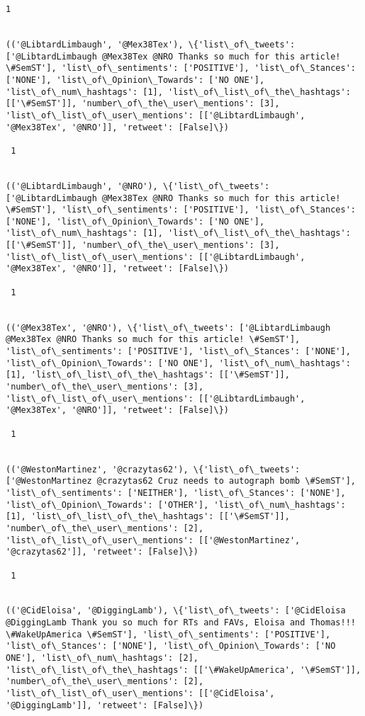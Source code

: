 \documentclass[11pt]{article}
\begin{document}
\begin{Verbatim}[commandchars=\\\{\}]
 1
 

(('@LibtardLimbaugh', '@Mex38Tex'), \{'list\_of\_tweets': ['@LibtardLimbaugh @Mex38Tex @NRO Thanks so much for this article! \#SemST'], 'list\_of\_sentiments': ['POSITIVE'], 'list\_of\_Stances': ['NONE'], 'list\_of\_Opinion\_Towards': ['NO ONE'], 'list\_of\_num\_hashtags': [1], 'list\_of\_list\_of\_the\_hashtags': [['\#SemST']], 'number\_of\_the\_user\_mentions': [3], 'list\_of\_list\_of\_user\_mentions': [['@LibtardLimbaugh', '@Mex38Tex', '@NRO']], 'retweet': [False]\})

 1
 

(('@LibtardLimbaugh', '@NRO'), \{'list\_of\_tweets': ['@LibtardLimbaugh @Mex38Tex @NRO Thanks so much for this article! \#SemST'], 'list\_of\_sentiments': ['POSITIVE'], 'list\_of\_Stances': ['NONE'], 'list\_of\_Opinion\_Towards': ['NO ONE'], 'list\_of\_num\_hashtags': [1], 'list\_of\_list\_of\_the\_hashtags': [['\#SemST']], 'number\_of\_the\_user\_mentions': [3], 'list\_of\_list\_of\_user\_mentions': [['@LibtardLimbaugh', '@Mex38Tex', '@NRO']], 'retweet': [False]\})

 1
 

(('@Mex38Tex', '@NRO'), \{'list\_of\_tweets': ['@LibtardLimbaugh @Mex38Tex @NRO Thanks so much for this article! \#SemST'], 'list\_of\_sentiments': ['POSITIVE'], 'list\_of\_Stances': ['NONE'], 'list\_of\_Opinion\_Towards': ['NO ONE'], 'list\_of\_num\_hashtags': [1], 'list\_of\_list\_of\_the\_hashtags': [['\#SemST']], 'number\_of\_the\_user\_mentions': [3], 'list\_of\_list\_of\_user\_mentions': [['@LibtardLimbaugh', '@Mex38Tex', '@NRO']], 'retweet': [False]\})

 1
 

(('@WestonMartinez', '@crazytas62'), \{'list\_of\_tweets': ['@WestonMartinez @crazytas62 Cruz needs to autograph bomb \#SemST'], 'list\_of\_sentiments': ['NEITHER'], 'list\_of\_Stances': ['NONE'], 'list\_of\_Opinion\_Towards': ['OTHER'], 'list\_of\_num\_hashtags': [1], 'list\_of\_list\_of\_the\_hashtags': [['\#SemST']], 'number\_of\_the\_user\_mentions': [2], 'list\_of\_list\_of\_user\_mentions': [['@WestonMartinez', '@crazytas62']], 'retweet': [False]\})

 1
 

(('@CidEloisa', '@DiggingLamb'), \{'list\_of\_tweets': ['@CidEloisa @DiggingLamb Thank you so much for RTs and FAVs, Eloisa and Thomas!!! \#WakeUpAmerica \#SemST'], 'list\_of\_sentiments': ['POSITIVE'], 'list\_of\_Stances': ['NONE'], 'list\_of\_Opinion\_Towards': ['NO ONE'], 'list\_of\_num\_hashtags': [2], 'list\_of\_list\_of\_the\_hashtags': [['\#WakeUpAmerica', '\#SemST']], 'number\_of\_the\_user\_mentions': [2], 'list\_of\_list\_of\_user\_mentions': [['@CidEloisa', '@DiggingLamb']], 'retweet': [False]\})


\end{Verbatim}
\end{document}
